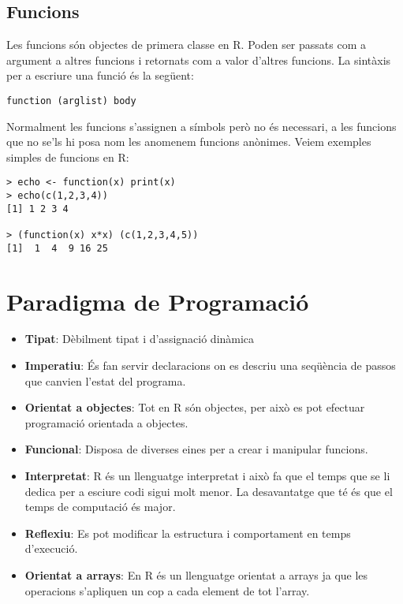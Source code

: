 \documentclass[12pt]{article}
\begin{document}
\subsection{Funcions}
Les funcions són objectes de primera classe en R. Poden ser passats com a argument a altres funcions i retornats com a valor d'altres funcions. La sintàxis per a escriure una funció és la següent: 
\begin{center}
\begin{verbatim}
function (arglist) body
\end{verbatim}
\end{center}
Normalment les funcions s'assignen a símbols però no és necessari, a les funcions que no se'ls hi posa nom les anomenem funcions anònimes. 
Veiem exemples simples de funcions en R: 
\begin{verbatim}
> echo <- function(x) print(x)
> echo(c(1,2,3,4))
[1] 1 2 3 4

> (function(x) x*x) (c(1,2,3,4,5))
[1]  1  4  9 16 25

\end{verbatim}
 

\section{Paradigma de Programació}
\begin{itemize}
\item \textbf{Tipat}: Dèbilment tipat i d'assignació dinàmica
\item \textbf{Imperatiu}: És fan servir declaracions on es descriu una seqüència de passos que canvien l'estat del programa.
\item \textbf{Orientat a objectes}: Tot en R són objectes, per això es pot efectuar programació orientada a objectes.
\item \textbf{Funcional}: Disposa de diverses eines per a crear i manipular funcions.
\item \textbf{Interpretat}: R és un llenguatge interpretat i això fa que el temps que se li dedica per a esciure codi sigui molt menor. La desavantatge que té és que el temps de computació és major.
\item \textbf{Reflexiu}: Es pot modificar la estructura i comportament en temps d'execució.
\item \textbf{Orientat a arrays}: En R és un llenguatge orientat a arrays ja que les operacions s'apliquen un cop a cada element de tot l'array.
\end{itemize}
\end{document}
